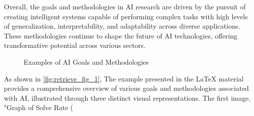 Overall, the goals and methodologies in AI research are driven by the pursuit of creating intelligent systems capable of performing complex tasks with high levels of generalization, interpretability, and adaptability across diverse applications. These methodologies continue to shape the future of AI technologies, offering transformative potential across various sectors.






{
\begin{figure}[ht!]
\centering
{}\hspace{0.03\textwidth}
\hspace{0.03\textwidth}
\caption{Examples of AI Goals and Methodologies}\label{fig:retrieve_fig_1}
\end{figure}
}


As shown in \autoref{fig:retrieve_fig_1}, The example presented in the LaTeX material provides a comprehensive overview of various goals and methodologies associated with AI, illustrated through three distinct visual representations. The first image, "Graph of Solve Rate (%

